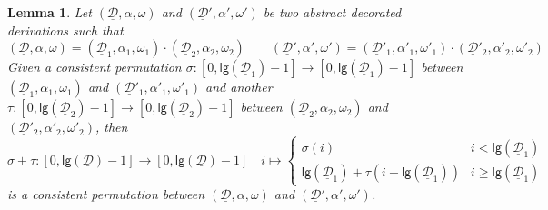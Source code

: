\documentclass[a4paper]{article}
\newcommand{\dder}[1]{\mathscr{#1}}
\newcommand{\der}[1]{\underline{\dder{#1}}}
\newcommand{\lgh}[0]{\mathsf{lg}}
\newtheorem{lemma}[theorem]{Lemma}
\theoremstyle{definition}
\begin{document}
\begin{lemma}\label{lem:sum} Let $(\der{D}, \alpha, \omega)$ and $(\der{D}', \alpha', \omega')$ be two abstract decorated derivations such that
	\[(\der{D}, \alpha, \omega)=(\der{D}_1, \alpha_1, \omega_1)\cdot (\der{D}_2, \alpha_2, \omega_2) \qquad (\der{D}', \alpha', \omega')=(\der{D}'_1, \alpha'_1, \omega'_1)\cdot (\der{D}'_2, \alpha'_2, \omega'_2)\]
	Given a consistent permutation $\sigma\colon [0, \lgh(\der{D}_1)-1]\to [0, \lgh(\der{D}_1)-1]$ between  $(\der{D}_1, \alpha_1, \omega_1)$ and $(\der{D}'_1, \alpha'_1, \omega'_1)$ and another $\tau\colon [0, \lgh(\der{D}_2)-1]\to [0, \lgh(\der{D}_2)-1]$ between $(\der{D}_2, \alpha_2, \omega_2)$ and $(\der{D}'_2, \alpha'_2, \omega'_2)$, then 
	\[\sigma+\tau\colon[0, \lgh(\der{D})-1]\to[0, \lgh(\der{D})-1] \quad i \mapsto \begin{cases}
		\sigma(i) & i < \lgh(\der{D}_1)\\
		\lgh(\der{D}_1)+\tau(i-\lgh(\der{D}_1)) &   i\geq \lgh(\der{D}_1) 
	\end{cases}\]
	is a consistent permutation between $(\der{D}, \alpha, \omega)$ and $(\der{D}', \alpha', \omega')$.
\end{lemma}
\end{document}
